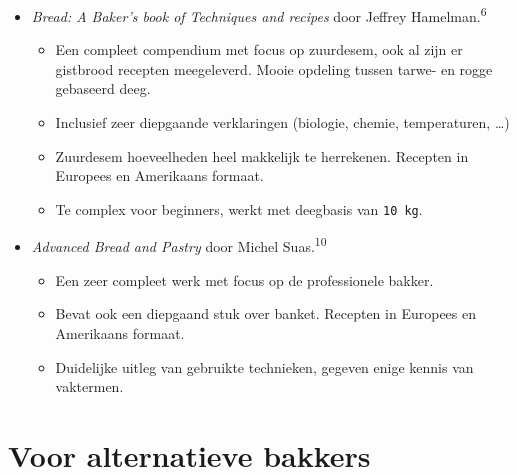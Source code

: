 \documentclass[
  11pt,
  dutch,
]{memoir}
\providecommand{\tightlist}{%
  \setlength{\itemsep}{0pt}\setlength{\parskip}{0pt}}
\begin{document}
\begin{itemize}
\tightlist
\item
  \emph{Bread: A Baker's book of Techniques and recipes} door
  \mbox{Jeffrey} Hamelman.\textsuperscript{6}

  \begin{itemize}
  \tightlist
  \item
    Een compleet compendium met focus op zuurdesem, ook al zijn er
    gistbrood recepten meegeleverd. Mooie opdeling tussen tarwe- en
    rogge gebaseerd deeg.
  \item
    Inclusief zeer diepgaande verklaringen (biologie, chemie,
    temperaturen, \ldots)
  \item
    Zuurdesem hoeveelheden heel makkelijk te herrekenen. Recepten in
    Europees en Amerikaans formaat.
  \item
    Te complex voor beginners, werkt met deegbasis van \texttt{10\ kg}.
  \end{itemize}
\item
  \emph{Advanced Bread and Pastry} door Michel Suas.\textsuperscript{10}

  \begin{itemize}
  \tightlist
  \item
    Een zeer compleet werk met focus op de professionele bakker.
  \item
    Bevat ook een diepgaand stuk over banket. Recepten in Europees en
    Amerikaans formaat.
  \item
    Duidelijke uitleg van gebruikte technieken, gegeven enige kennis van
    vaktermen.
  \end{itemize}
\end{itemize}

\hypertarget{voor-alternatieve-bakkers}{%
\section{Voor alternatieve bakkers}\label{voor-alternatieve-bakkers}}
\end{document}
